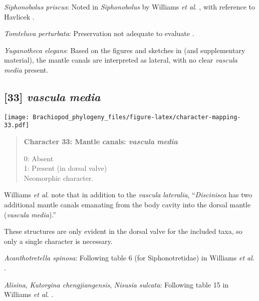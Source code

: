 \documentclass[openany]{book}
\theoremstyle{definition}
\theoremstyle{definition}
\theoremstyle{definition}
\theoremstyle{remark}
\begin{document}
\hypertarget{Siphonobolus_priscus-coding-32}{}
\emph{Siphonobolus priscus}: Noted in \emph{Siphonobolus} by Williams
\emph{et al}. \citeyearpar{Williams2000LinguliformeaCraniiformea}, with
reference to Havlicek \citeyearpar{Havlicek1982LingulaceaPaterinacea}.

\hypertarget{Tomteluva_perturbata-coding-32}{}
\emph{Tomteluva perturbata}: Preservation not adequate to evaluate
\citep{Streng2016Anew}.

\hypertarget{Yuganotheca_elegans-coding-32}{}
\emph{Yuganotheca elegans}: Based on the figures and sketches in
\citet{Zhang2014Anearly} (and supplementary material), the mantle canals
are interpreted as lateral, with no clear \emph{vascula} \emph{media}
present.

\subsection*{\texorpdfstring{{[}33{]} \emph{vascula}
\emph{media}}{{[}33{]} vascula media}}\label{vascula-media}

\texttt{[image: Brachiopod\_phylogeny\_files/figure-latex/character-mapping-33.pdf]}

\begin{quote}
\textbf{Character 33: Mantle canals: \emph{vascula} \emph{media}}

0: Absent\\
1: Present (in dorsal valve)\\
Neomorphic character.
\end{quote}

Williams \emph{et al}. \citeyearpar{Williams1997Introduction} note that
in addition to the \emph{vascula} \emph{lateralia}, ``\emph{Discinisca}
has two additional mantle canals emanating from the body cavity into the
dorsal mantle (\emph{vascula} \emph{media}).''

These structures are only evident in the dorsal valve for the included
taxa, so only a single character is necessary.

\hypertarget{Acanthotretella_spinosa-coding-33}{}
\emph{Acanthotretella spinosa}: Following table 6 (for Siphonotretidae)
in Williams \emph{et al}.
\citeyearpar{Williams2000LinguliformeaCraniiformea}.

\hypertarget{Alisina-coding-33}{}
\emph{Alisina}, \emph{Kutorgina chengjiangensis}, \emph{Nisusia
sulcata}: Following table 15 in Williams \emph{et al}.
\citeyearpar{Williams2000LinguliformeaCraniiformea}.
\end{document}
